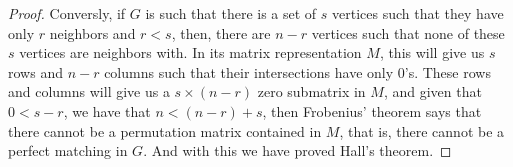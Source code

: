 \begin{proof}
        Conversly, if $G$ is such that there is a set of $s$ vertices such that they have only $r$ neighbors and $r < s$, then, there are $n - r$
        vertices such that none of these $s$ vertices are neighbors with. In its matrix representation $M$, this will give us $s$ rows and $n - r$
        columns such that their intersections have only $0$'s. These rows and columns will give us a $s \times (n - r)$ zero submatrix in $M$, and
        given that $0 < s - r$, we have that $n < (n - r) + s$, then Frobenius' theorem says that there cannot be a permutation matrix contained in 
        $M$, that is, there cannot be a perfect matching in $G$. And with this we have proved Hall's theorem.
    \end{proof}